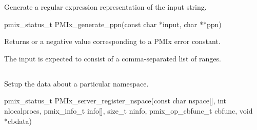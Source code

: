 \summary

Generate a regular expression representation of the input string.

\format

\cspecificstart
\begin{codepar}
pmix_status_t PMIx_generate_ppn(const char *input, char **ppn)
\end{codepar}
\cspecificend

\begin{arglist}
\end{arglist}

Returns  or a negative value corresponding to a PMIx error constant.

\descr

The input is expected to consist of a comma-separated list of ranges.



\subsection{}

\summary

Setup the data about a particular namespace.

\format

\cspecificstart
\begin{codepar}
pmix_status_t PMIx_server_register_nspace(const char nspace[], int nlocalprocs,
                                          pmix_info_t info[], size_t ninfo,
                                          pmix_op_cbfunc_t cbfunc, void *cbdata)
\end{codepar}
\cspecificend

\begin{arglist}
\end{arglist}

